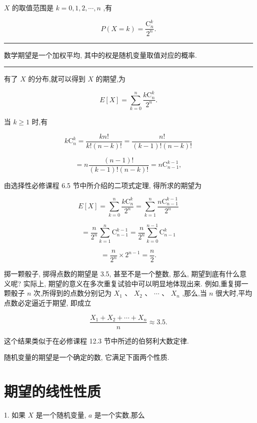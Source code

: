 \documentclass[10pt]{article}
\newcommand{\HRule}{\begin{center}\rule{0.9\linewidth}{0.2mm}\end{center}}
\begin{document}
\(X\) 的取值范围是 \(k = 0,1,2,\cdots ,n\) ,有



\[
P\left( {X = k}\right)  = \frac{{\mathrm{C}}_{n}^{k}}{{2}^{n}}.
\]

\HRule

数学期望是一个加权平均, 其中的权是随机变量取值对应的概率.

\HRule

有了 \(X\) 的分布,就可以得到 \(X\) 的期望,为

\[
E\left\lbrack  X\right\rbrack   = \mathop{\sum }\limits_{{k = 0}}^{n}\frac{k{\mathrm{C}}_{n}^{k}}{{2}^{n}}.
\]

当 \(k \geq  1\) 时,有

\[
k{\mathrm{C}}_{n}^{k} = \frac{{kn}!}{k!\left( {n - k}\right) !} = \frac{n!}{\left( {k - 1}\right) !\left( {n - k}\right) !}
\]

\[
= n\frac{\left( {n - 1}\right) !}{\left( {k - 1}\right) !\left( {n - k}\right) !} = n{\mathrm{C}}_{n - 1}^{k - 1},
\]

由选择性必修课程 6.5 节中所介绍的二项式定理, 得所求的期望为

\[
E\left\lbrack  X\right\rbrack   = \mathop{\sum }\limits_{{k = 0}}^{n}\frac{k{\mathrm{C}}_{n}^{k}}{{2}^{n}} = \mathop{\sum }\limits_{{k = 1}}^{n}\frac{n{\mathrm{C}}_{n - 1}^{k - 1}}{{2}^{n}}
\]

\[
= \frac{n}{{2}^{n}}\mathop{\sum }\limits_{{k = 1}}^{n}{\mathrm{C}}_{n - 1}^{k - 1} = \frac{n}{{2}^{n}}\mathop{\sum }\limits_{{k = 0}}^{{n - 1}}{\mathrm{C}}_{n - 1}^{k}
\]

\[
= \frac{n}{{2}^{n}} \times  {2}^{n - 1} = \frac{n}{2}.
\]

掷一颗骰子, 掷得点数的期望是 3.5, 甚至不是一个整数, 那么, 期望到底有什么意义呢? 实际上, 期望的意义在多次重复试验中可以明显地体现出来. 例如,重复掷一颗骰子 \(n\) 次,所得到的点数分别记为 \({X}_{1}\text{ 、 }{X}_{2}\text{ 、 }\cdots \text{ 、 }{X}_{n}\) ,那么,当 \(n\) 很大时,平均点数必定逼近于期望, 即成立

\[
\frac{{X}_{1} + {X}_{2} + \cdots  + {X}_{n}}{n} \approx  {3.5}.
\]

这个结果类似于在必修课程 12.3 节中所述的伯努利大数定律.

随机变量的期望是一个确定的数, 它满足下面两个性质.

\section*{期望的线性性质}

1. 如果 \(X\) 是一个随机变量, \(a\) 是一个实数,那么
\end{document}
